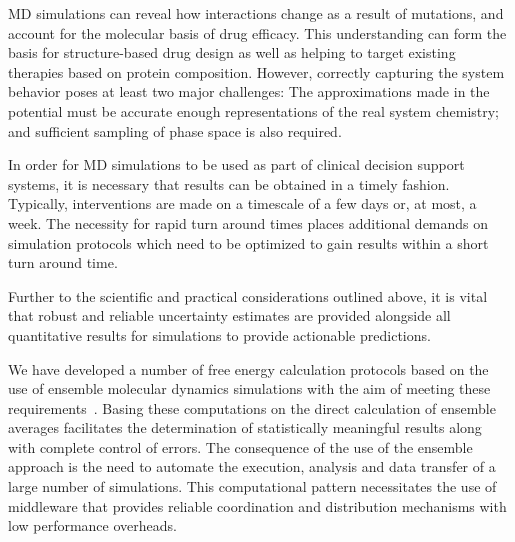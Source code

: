 MD simulations can reveal how interactions change as a result of mutations,
and account for the molecular basis of drug efficacy. This understanding can
form the basis for structure-based drug design as well as helping to target
existing therapies based on protein composition. However, correctly capturing
the system behavior poses at least two major challenges: The approximations
made in the potential must be accurate enough representations of the real
system chemistry; and sufficient sampling of phase space is also required.

In order for MD simulations to be used as part of clinical decision support
systems, it is necessary that results can be obtained in a timely fashion.
Typically, interventions are made on a timescale of a few days or, at most, a
week. The necessity for rapid turn around times places additional demands on
simulation protocols which need to be optimized to gain results within a
short turn around time.

Further to the scientific and practical considerations outlined above, it is
vital that robust and reliable uncertainty estimates are provided alongside
all quantitative results for simulations to provide actionable predictions.

We have developed a number of free energy calculation protocols based on the
use of ensemble molecular dynamics simulations with the aim of meeting these
requirements~\cite{Sadiq2008, Sadiq2010, Wan2017brd4, Wan2017trk}. Basing
these computations on the direct calculation of ensemble averages facilitates
the determination of statistically meaningful results along with complete
control of errors. The consequence of the use of the ensemble approach is the
need to automate the execution, analysis and data transfer of a large number
of simulations. This computational pattern necessitates the use of middleware
that provides reliable coordination and distribution mechanisms with low
performance overheads.